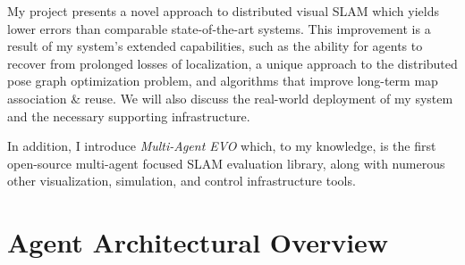 






\label{sec:3}

My project presents a novel approach to distributed visual SLAM which yields lower errors than comparable state-of-the-art systems. This improvement is a result of my system's extended capabilities, such as the ability for agents to recover from prolonged losses of localization, a unique approach to the distributed pose graph optimization problem, and algorithms that improve long-term map association \& reuse. We will also discuss the real-world deployment of my system and the necessary supporting infrastructure.

In addition, I introduce \textit{Multi-Agent EVO} which, to my knowledge, is the first open-source multi-agent focused SLAM evaluation library, along with numerous other visualization, simulation, and control infrastructure tools.

\section{Agent Architectural Overview}
\label{sec:architectural-overview}

